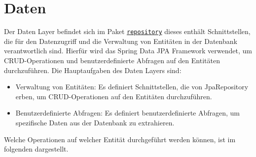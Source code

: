 
\chapter{Daten}
\label{ch:data}

Der Daten Layer befindet sich im Paket \hyperref[edu.kit.hci.soli.repository]{\texttt{repository}} dieses enthält Schnittstellen, die für den Datenzugriff und die Verwaltung von Entitäten in der Datenbank verantwortlich sind.
Hierfür wird das Spring Data JPA Framework verwendet, um \gls{CRUD}-Operationen und benutzerdefinierte Abfragen auf den Entitäten durchzuführen.
Die Hauptaufgaben des Daten Layers sind:

\begin{itemize}
    \item Verwaltung von Entitäten: Es definiert Schnittstellen, die von JpaRepository erben, um CRUD-Operationen auf den Entitäten durchzuführen.
    \item Benutzerdefinierte Abfragen: Es definiert benutzerdefinierte Abfragen, um spezifische Daten aus der Datenbank zu extrahieren.
\end{itemize}

Welche Operationen auf welcher Entität durchgeführt werden können, ist im folgenden dargestellt.

